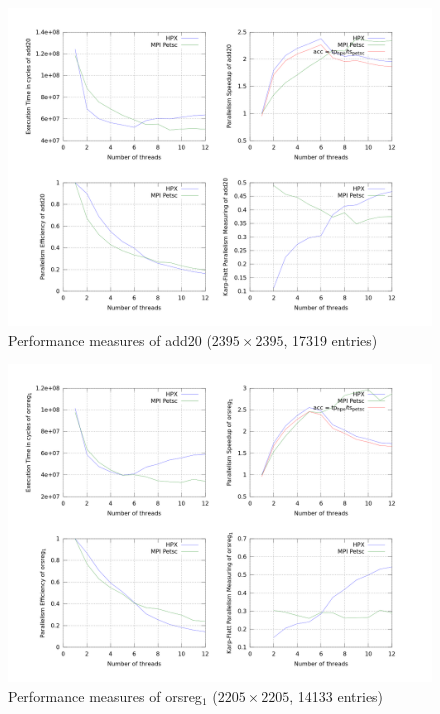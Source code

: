 \documentclass[smallextended]{svjour3}
\begin{document}
\begin{figure}[h!]
\begin{center}
\includegraphics[scale=0.25]{Images/add20.png}
\end{center}
\caption{Performance measures of add20 ($2395\times2395$, 17319 entries)}
\label{add20}
\end{figure}

\begin{figure}[h!]
\begin{center}
\includegraphics[scale=0.25]{Images/orsreg1.png}
\end{center}
\caption{Performance measures of orsreg$_1$ ($2205\times2205$, 14133 entries)}
\label{orsreg_1}
\end{figure}
\end{document}
